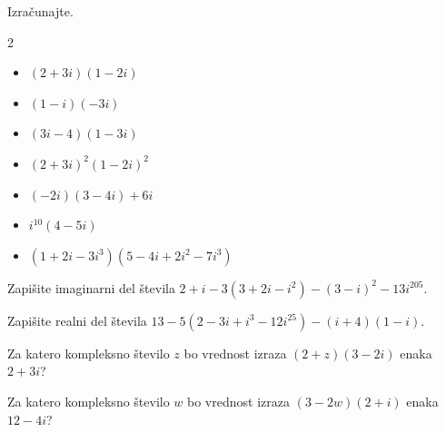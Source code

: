             \begin{naloga}
                Izračunajte.

                \begin{multicols}{2}
                    
                \begin{itemize}
                        \item $\left(2+3i\right)\left(1-2i\right)$ 
                        \item $\left(1-i\right)\left(-3i\right)$ 
                        \item $\left(3i-4\right)\left(1-3i\right)$ 
                        \item $\left(2+3i\right)^2\left(1-2i\right)^2$ 
                        \item $\left(-2i\right)\left(3-4i\right)+6i$ 
                        \item $i^{10}\left(4-5i\right)$ 
                        \item $\left(1+2i-3i^3\right)\left(5-4i+2i^2-7i^3\right)$ 
                    \end{itemize}
                \end{multicols}

            \end{naloga}

                
            \begin{naloga}
                Zapišite imaginarni del števila $2+i-3\left(3+2i-i^2\right)-\left(3-i\right)^2-13i^{205}$.                 
            \end{naloga}


            \begin{naloga}
                Zapišite realni del števila $13-5\left(2-3i+i^3-12i^{25}\right)-\left(i+4\right)\left(1-i\right)$.
            \end{naloga}


            \begin{naloga}
                Za katero kompleksno število $z$ bo vrednost izraza $\left(2+z\right)\left(3-2i\right)$ enaka $2+3i$?
            \end{naloga}


            \begin{naloga}
                Za katero kompleksno število $w$ bo vrednost izraza $\left(3-2w\right)\left(2+i\right)$ enaka $12-4i$?
            \end{naloga}


